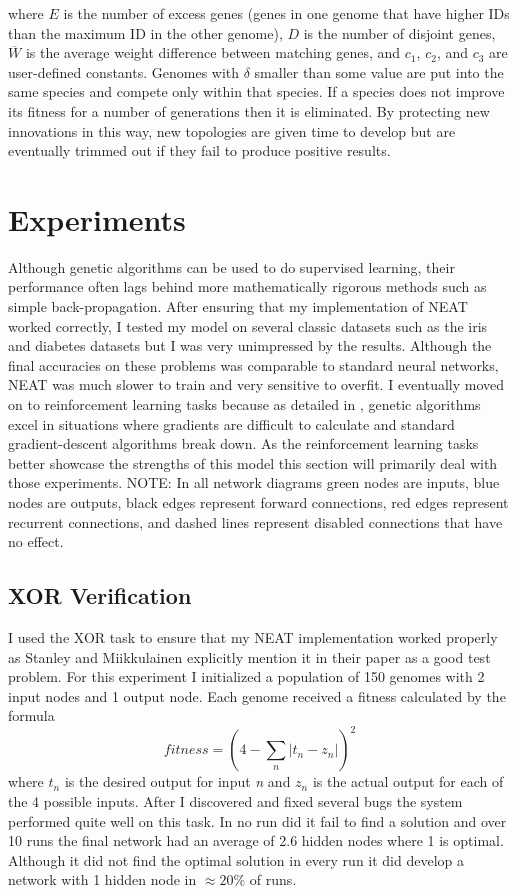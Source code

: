 \documentclass[twocolumn,letterpaper]{article}
\begin{document}
where $E$ is the number of excess genes (genes in one genome that have higher IDs than the maximum
ID in the other genome), $D$ is the number of disjoint genes, $\overline{W}$ is the average weight
difference between matching genes, and $c_1$, $c_2$, and $c_3$ are user-defined constants. Genomes with 
$\delta$ smaller than some value are put into the same species and compete only within that species. If a
species does not improve its fitness for a number of generations then it is eliminated. By protecting new
innovations in this way, new topologies are given time to develop but are eventually trimmed out if they 
fail to produce positive results.


  
\section{Experiments} \label{sec:experiments}
Although genetic algorithms can be used to do supervised learning, their performance often lags behind
more mathematically rigorous methods such as simple back-propagation. After ensuring that my implementation of NEAT worked correctly, I tested my model on several classic datasets such as the iris and diabetes datasets but I was very unimpressed by the
results. Although the final accuracies on these problems was comparable to standard neural networks, NEAT was 
much slower to train and very sensitive to overfit. I eventually moved on to reinforcement learning tasks
because as detailed in \cite{whitley}, genetic algorithms excel in situations where gradients are difficult to
calculate and standard gradient-descent algorithms break down. As the reinforcement learning tasks better
showcase the strengths of this model this section will primarily deal with those experiments. NOTE: In all
network diagrams green nodes are inputs, blue nodes are outputs, black edges represent forward connections,
red edges represent recurrent connections, and dashed lines represent disabled connections that have no
effect.

\subsection{XOR Verification} \label{sec:xor}
I used the XOR task to ensure that my NEAT implementation worked properly as Stanley and 
Miikkulainen explicitly mention it in their paper as a good test problem. For this experiment I 
initialized a population of 150 genomes with 2 input nodes and 1 output node. Each genome received
a fitness calculated by the formula 
\begin{equation}
fitness = (4-\sum_{n} \left|t_n-z_n\right|)^2 
\end{equation}
where $t_n$ is the desired output for input \textit{n} and $z_n$ is the actual output for each of the 4
possible inputs. After I discovered and fixed several bugs the system performed quite well on this task. 
In no run did it fail to find a solution and over 10 runs the final network had an average of 2.6 hidden
nodes where 1 is optimal. Although it did not find the optimal solution in every run it did develop a 
network with 1 hidden node in $\approx20\%$ of runs.
\end{document}
